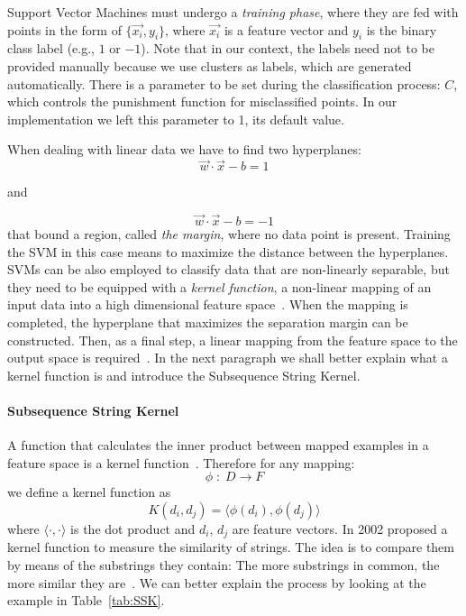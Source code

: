 Support Vector Machines must undergo a \emph{training phase}, where they are fed with points
in the form of $\{\vec{x_i}, y_i\}$, where $\vec{x_i}$ is a feature vector and $y_i$ is the
binary class label (e.g., $1$ or $-1$). Note that in our context, the labels need not to be provided manually because we use clusters as labels, which are generated automatically. There is a parameter to be set during the classification process:
$C$, which controls the punishment function for misclassified points. In our implementation
we left this parameter to 1, its default value.

When dealing with linear data we have to
find two hyperplanes:
\[ \vec{w} \cdot \vec{x} -b = 1\]
\begin{center}
and
\end{center}
\[ \vec{w} \cdot \vec{x} -b = -1\]
that bound a region, called \emph{the margin}, where no data point is present. Training the
SVM in this case means to maximize the distance between the hyperplanes.
SVMs can be also employed to classify data that are non-linearly separable, but they need to
be equipped with a \emph{kernel function}, a non-linear mapping of an input data into a high
dimensional feature space~\cite{haddadi2013malicious}. When the mapping is completed, the
hyperplane that maximizes the separation margin can be constructed. Then, as a final step,
a linear mapping from the feature space to the output space is required~\cite{haddadi2013malicious}. In the next paragraph we shall better explain what a kernel function
is and introduce the Subsequence String Kernel.


\paragraph{Subsequence String Kernel} %
\label{par:subsequence_string_kernel}
A function that calculates the inner product between mapped examples in a feature space
is a kernel function~\cite{lodhi2002}. Therefore for any mapping:
\[ \phi \; : \; D \rightarrow F \]
we define a kernel function as
\[ K(d_i, d_j) = \langle \phi(d_i), \phi(d_j) \rangle \]
where $\langle \cdot , \cdot \rangle$ is the dot product and $d_i$, $d_j$ are feature vectors.
In 2002 \citet{lodhi2002} proposed a kernel function to measure the similarity of strings.
The idea is to compare them by means of the substrings they contain: The more substrings
in common, the more similar they are~\cite{lodhi2002}. We can better explain the process
by looking at the example in Table~\ref{tab:SSK}.

